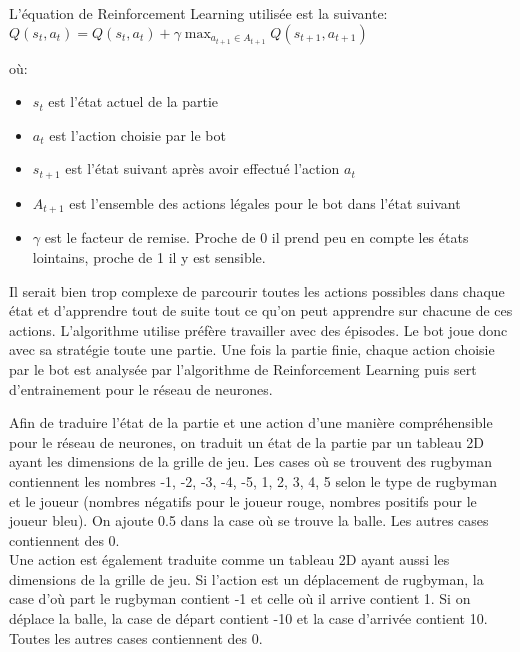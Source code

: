 \documentclass[a4paper,12pt]{article}
\begin{document}
L'équation de Reinforcement Learning utilisée est la suivante:\\

$Q(s_{t},a_{t}) = Q(s_{t},a_{t}) + \gamma \max_{a_{t+1} \in A_{t+1}} Q(s_{t+1},a_{t+1})$
\newline

où:
\begin{itemize}
    \item $s_{t}$ est l'état actuel de la partie
    \item $a_{t}$ est l'action choisie par le bot
    \item $s_{t+1}$ est l'état suivant après avoir effectué l'action $a_{t}$
    \item $A_{t+1}$ est l'ensemble des actions légales pour le bot dans l'état suivant
    \item $\gamma$ est le facteur de remise. Proche de 0 il prend peu en compte les états lointains, proche de 1 il y est sensible.
\end{itemize}
Il serait bien trop complexe de parcourir toutes les actions possibles dans chaque état et d'apprendre tout de suite tout ce qu'on peut apprendre sur chacune de ces actions. L'algorithme utilise préfère travailler avec des épisodes. Le bot joue donc avec sa stratégie toute une partie. Une fois la partie finie, chaque action choisie par le bot est analysée par l'algorithme de Reinforcement Learning puis sert d'entrainement pour le réseau de neurones.

Afin de traduire l'état de la partie et une action d'une manière compréhensible pour le réseau de neurones, on traduit un état de la partie par un tableau 2D ayant les dimensions de la grille de jeu. Les cases où se trouvent des rugbyman contiennent les nombres -1, -2, -3, -4, -5, 1, 2, 3, 4, 5 selon le type de rugbyman et le joueur (nombres négatifs pour le joueur rouge, nombres positifs pour le joueur bleu). On ajoute 0.5 dans la case où se trouve la balle. Les autres cases contiennent des 0.\\
Une action est également traduite comme un tableau 2D ayant aussi les dimensions de la grille de jeu. Si l'action est un déplacement de rugbyman, la case d'où part le rugbyman contient -1 et celle où il arrive contient 1. Si on déplace la balle, la case de départ contient -10 et la case d'arrivée contient 10. Toutes les autres cases contiennent des 0.\\
\end{document}

